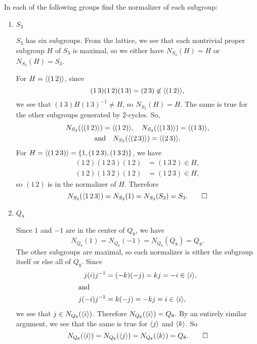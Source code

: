  In each of the following groups find the normalizer of each
subgroup:
\begin{enumerate}
\item $S_3$
  \begin{solution}
    $S_3$ has six subgroups. From the lattice, we see that each
    nontrivial proper subgroup $H$ of $S_3$ is maximal, so we either
    have $N_{S_3}(H) = H$ or $N_{S_3}(H) = S_3$.

    For $H = \langle{(1\,2)}\rangle$, since
    \begin{equation*}
      (1\,3)(1\,2)(1\,3) = (2\,3) \not\in \langle{(1\,2)}\rangle,
    \end{equation*}
    we see that $(1\,3)H(1\,3)^{-1} \neq H$, so $N_{S_3}(H) = H$. The
    same is true for the other subgroups generated by $2$-cycles. So,
    \begin{multline*}
      N_{S_3}(\langle{(1\,2)}\rangle) = \langle{(1\,2)}\rangle,
      \quad
      N_{S_3}(\langle{(1\,3)}\rangle) = \langle{(1\,3)}\rangle, \\
      \text{and}\quad
      N_{S_3}(\langle{(2\,3)}\rangle) = \langle{(2\,3)}\rangle.
    \end{multline*}
    For $H = \langle{(1\,2\,3)}\rangle = \{1,(1\,2\,3),(1\,3\,2)\}$, we have
    \begin{align*}
      (1\,2)(1\,2\,3)(1\,2) &= (1\,3\,2)\in H, \\
      (1\,2)(1\,3\,2)(1\,2) &= (1\,2\,3)\in H,
    \end{align*}
    so $(1\,2)$ is in the normalizer of $H$. Therefore
    \begin{equation*}
      N_{S_3}(\langle{1\,2\,3}\rangle) = N_{S_3}(1) = N_{S_3}(S_3) = S_3. \qedhere
    \end{equation*}
  \end{solution}
\item $Q_8$
  \begin{solution}
    Since $1$ and $-1$ are in the center of $Q_8$, we have
    \begin{equation*}
      N_{Q_8}(1) = N_{Q_8}(-1) = N_{Q_8}(Q_8) = Q_8.
    \end{equation*}
    The other subgroups are maximal, so each normalizer is either the
    subgroup itself or else all of $Q_8$. Since
    \begin{align*}
      j(i)j^{-1} &= (-k)(-j) = kj = -i\in\langle{i}\rangle, \\ \intertext{and}
      j(-i)j^{-1} &= k(-j) = -kj = i\in\langle{i}\rangle,
    \end{align*}
    we see that $j\in N_{Q_8}(\langle{i}\rangle)$. Therefore
    $N_{Q_8}(\langle{i}\rangle) = Q_8$. By an entirely similar argument, we see
    that the same is true for $\langle{j}\rangle$ and $\langle{k}\rangle$. So
    \begin{equation*}
      N_{Q_8}(\langle{i}\rangle) = N_{Q_8}(\langle{j}\rangle) = N_{Q_8}(\langle{k}\rangle) = Q_8. \qedhere
    \end{equation*}
  \end{solution}
\end{enumerate}

